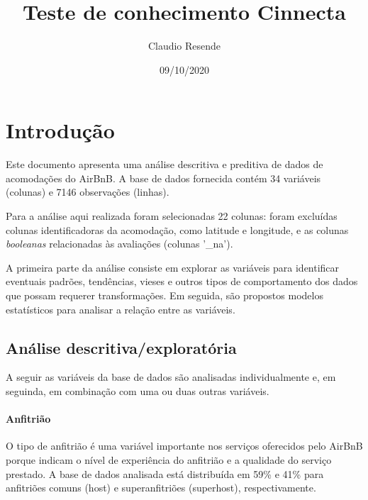 \documentclass[
]{article}
\title{Teste de conhecimento Cinnecta}
\author{Claudio Resende}
\date{09/10/2020}
\begin{document}
\maketitle

\hypertarget{introduuxe7uxe3o}{%
\section{Introdução}\label{introduuxe7uxe3o}}

Este documento apresenta uma análise descritiva e preditiva de dados de
acomodações do AirBnB. A base de dados fornecida contém 34 variáveis
(colunas) e 7146 observações (linhas).

Para a análise aqui realizada foram selecionadas 22 colunas: foram
excluídas colunas identificadoras da acomodação, como latitude e
longitude, e as colunas \emph{booleanas} relacionadas às avaliações
(colunas '\_na').

A primeira parte da análise consiste em explorar as variáveis para
identificar eventuais padrões, tendências, vieses e outros tipos de
comportamento dos dados que possam requerer transformações. Em seguida,
são propostos modelos estatísticos para analisar a relação entre as
variáveis.

\hypertarget{anuxe1lise-descritivaexploratuxf3ria}{%
\subsection{Análise
descritiva/exploratória}\label{anuxe1lise-descritivaexploratuxf3ria}}

A seguir as variáveis da base de dados são analisadas individualmente e,
em seguinda, em combinação com uma ou duas outras variáveis.

\hypertarget{anfitriuxe3o}{%
\paragraph{Anfitrião}\label{anfitriuxe3o}}

O tipo de anfitrião é uma variável importante nos serviços oferecidos
pelo AirBnB porque indicam o nível de experiência do anfitrião e a
qualidade do serviço prestado. A base de dados analisada está
distribuída em 59\% e 41\% para anfitriões comuns (host) e
superanfitriões (superhost), respectivamente.
\end{document}
